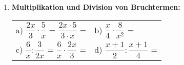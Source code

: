 \begin{enumerate}[label=\arabic*., resume]
    \item \textbf{Multiplikation und Division von Bruchtermen:}
    \vspace{0.5cm}

    \begin{tabular}{ll}
        a) $\dfrac{2x}{3} \cdot \dfrac{5}{x}$ = $\dfrac{2x \cdot 5}{3 \cdot x}$ = \underline{\hspace{2cm}} & b) $\dfrac{x}{4} \cdot \dfrac{8}{x^2}$ = \underline{\hspace{2cm}} \\[4ex]
        c) $\dfrac{6}{x} : \dfrac{3}{2x}$ = $\dfrac{6}{x} \cdot \dfrac{2x}{3}$ = \underline{\hspace{2cm}} & d) $\dfrac{x+1}{2} : \dfrac{x+1}{4}$ = \underline{\hspace{2cm}}
    \end{tabular}

\end{enumerate}
